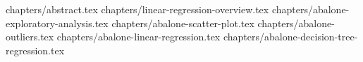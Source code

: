 \documentclass[a4paper,12pt]{article}
\begin{document}
 
 
 

\tableofcontents
\clearpage
{chapters/abstract.tex}
{chapters/linear-regression-overview.tex}
{chapters/abalone-exploratory-analysis.tex}
{chapters/abalone-scatter-plot.tex}
{chapters/abalone-outliers.tex}
{chapters/abalone-linear-regression.tex}
{chapters/abalone-decision-tree-regression.tex}
 


\end{document}
